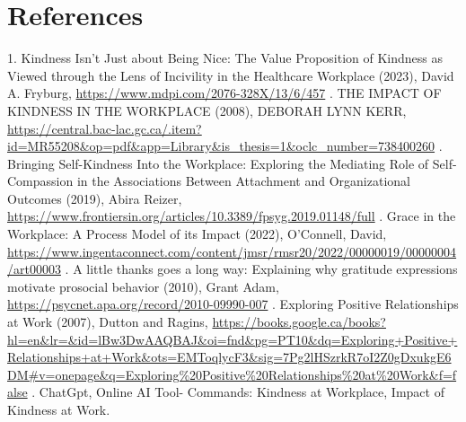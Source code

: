 \documentclass[a4paper, 11pt]{report}
\begin{document}
\pagebreak
\section{References}
1. Kindness Isn’t Just about Being Nice: The Value Proposition of Kindness as Viewed through the Lens of Incivility in the Healthcare Workplace (2023), David A. Fryburg, \url{https://www.mdpi.com/2076-328X/13/6/457}
\vspace{5mm} %
. THE IMPACT OF KINDNESS IN THE WORKPLACE (2008), DEBORAH LYNN KERR, \url{https://central.bac-lac.gc.ca/.item?id=MR55208&op=pdf&app=Library&is_thesis=1&oclc_number=738400260}
\vspace{5mm} %
. Bringing Self-Kindness Into the Workplace: Exploring the Mediating Role of Self-Compassion in the Associations Between Attachment and Organizational Outcomes (2019), Abira Reizer, \url{https://www.frontiersin.org/articles/10.3389/fpsyg.2019.01148/full}
\vspace{5mm} %
. Grace in the Workplace: A Process Model of its Impact (2022),  O'Connell, David, \url{ https://www.ingentaconnect.com/content/jmsr/rmsr20/2022/00000019/00000004/art00003}
\vspace{5mm} %
. A little thanks goes a long way: Explaining why gratitude expressions motivate prosocial behavior (2010), Grant Adam, \url{https://psycnet.apa.org/record/2010-09990-007}
\vspace{5mm} %
. Exploring Positive Relationships at Work (2007), Dutton and Ragins, \url{https://books.google.ca/books?hl=en&lr=&id=lBw3DwAAQBAJ&oi=fnd&pg=PT10&dq=Exploring+Positive+Relationships+at+Work&ots=EMToqlycF3&sig=7Pg2lHSzrkR7oI2Z0gDxukgE6DM#v=onepage&q=Exploring%20Positive%20Relationships%20at%20Work&f=false}
\vspace{5mm} %
. ChatGpt, Online AI Tool-
   Commands: Kindness at Workplace, Impact of Kindness at Work.
\end{document}
